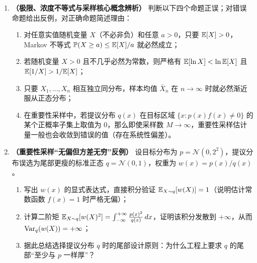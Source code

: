 \begin{enumerate}[label=\textbf{3.\arabic*}, leftmargin=2.4em]
  \item \textbf{（极限、浓度不等式与采样核心概念辨析）} 判断以下四个命题正误；对错误命题给出反例，对正确命题简述理由：
  \begin{enumerate}[label=(\alph*), leftmargin=1.8em]
    \item 对任意实值随机变量 $X$（不必非负）和任意 $a > 0$，只要 $\mathbb{E}[X] > 0$，Markov 不等式 $\mathbb{P}(X \ge a) \le \mathbb{E}[X]/a$ 就必然成立；
    \item 若随机变量 $X > 0$ 且不几乎必然为常数，则严格有 $\mathbb{E}[\ln X] < \ln \mathbb{E}[X]$ 且 $\mathbb{E}[1/X] > 1/\mathbb{E}[X]$；
    \item 只要 $X_1,\dots,X_n$ 相互独立同分布，样本均值 $\bar{X}_n$ 在 $n \to \infty$ 时就必然渐近服从正态分布；
    \item 在重要性采样中，若提议分布 $q(x)$ 在目标区域 $\{x: p(x)f(x) \neq 0\}$ 的某个正概率子集上取值为 $0$，那么即使采样数 $M \to \infty$，重要性采样估计量一般也会收敛到错误的值（存在系统性偏差）。
  \end{enumerate}

  \item \textbf{（重要性采样“无偏但方差无穷”反例）} 设目标分布为 $p = \mathcal{N}(0, 2^2)$，提议分布误选为尾部更瘦的标准正态 $q = \mathcal{N}(0, 1)$，权重为 $w(x) = p(x)/q(x)$。
  \begin{enumerate}[label=(\arabic*), leftmargin=1.8em]
    \item 写出 $w(x)$ 的显式表达式，直接积分验证 $\mathbb{E}_{X\sim q}[w(X)] = 1$（说明估计常数函数 $f(x)=1$ 时严格无偏）；
    \item 计算二阶矩 $\mathbb{E}_{X\sim q}[w(X)^2] = \int_{-\infty}^{+\infty} \frac{p(x)^2}{q(x)}\,dx$，证明该积分发散到 $+\infty$，从而 $\operatorname{Var}_q(w(X)) = +\infty$；
    \item 据此总结选择提议分布 $q$ 时的尾部设计原则：为什么工程上要求 $q$ 的尾部“至少与 $p$ 一样厚”？
  \end{enumerate}
\end{enumerate}


